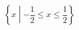 \documentclass{ltjsarticle}
\begin{document}
\[ \left\{ x \middle| -\frac{1}{2} \leq x \leq \frac{1}{2} \right\} \]
\end{document}
